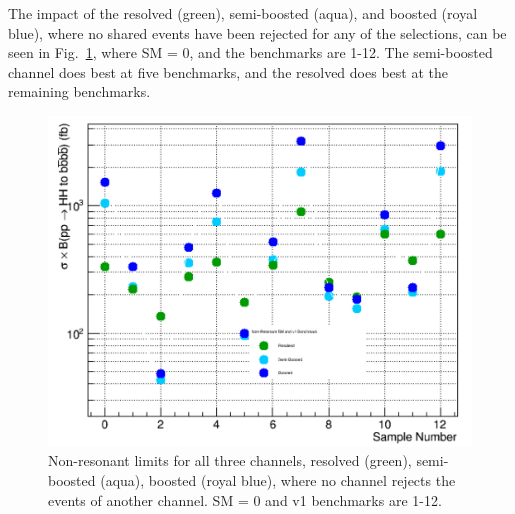 The impact of the resolved (green), semi-boosted (aqua), and boosted (royal blue), where no shared events have been rejected for any of the selections, can be seen in Fig.~\ref{fig:limcompare}, where SM = 0, and the benchmarks are 1-12. The semi-boosted channel does best at five benchmarks, and the resolved does best at the remaining benchmarks. 
\begin{figure}
\centering
\includegraphics[scale=0.5]{F5/NRlimits.pdf}
\caption{Non-resonant limits for all three channels, resolved (green), semi-boosted (aqua), boosted (royal blue), where no channel rejects the events of another channel. SM = 0 and v1 benchmarks are 1-12.}
\label{fig:limcompare}
\end{figure}